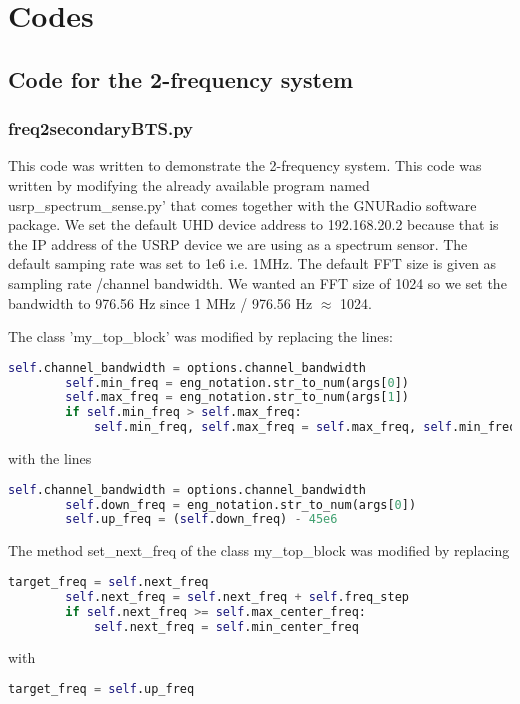 \chapter{Codes}

\section{Code for the 2-frequency system}


\subsection{freq2secondaryBTS.py}

This code was written to demonstrate the 2-frequency system.
This code was written by modifying the already available program named 
\textsf{usrp\_spectrum\_sense.py'} that comes together with the GNURadio software
package. We set the 
default UHD device address to \textsf{192.168.20.2} because that is the IP address
of the USRP device we are using as a spectrum sensor. The default samping rate
was set to 1e6 i.e. 1MHz. The default FFT size is given as
\textsf{sampling rate /channel bandwidth}. We wanted an FFT size of 1024 so we
set the bandwidth to
976.56 Hz since 1 MHz / 976.56 Hz $\approx$ 1024.

The class 'my\_top\_block' was modified by replacing the lines:
\begin{lstlisting}[language=Python]
        self.channel_bandwidth = options.channel_bandwidth
        self.min_freq = eng_notation.str_to_num(args[0])
        self.max_freq = eng_notation.str_to_num(args[1])
        if self.min_freq > self.max_freq:
            self.min_freq, self.max_freq = self.max_freq, self.min_freq    
\end{lstlisting}
with the lines
\begin{lstlisting}[language=Python]
        self.channel_bandwidth = options.channel_bandwidth
        self.down_freq = eng_notation.str_to_num(args[0])
        self.up_freq = (self.down_freq) - 45e6    
\end{lstlisting}

The method \textsf{set\_next\_freq} of the class \textsf{my\_top\_block} was modified by
replacing
\begin{lstlisting}[language=Python]
        target_freq = self.next_freq
        self.next_freq = self.next_freq + self.freq_step
        if self.next_freq >= self.max_center_freq:
            self.next_freq = self.min_center_freq
\end{lstlisting}
with
\begin{lstlisting}[language=Python]
        target_freq = self.up_freq
\end{lstlisting}




